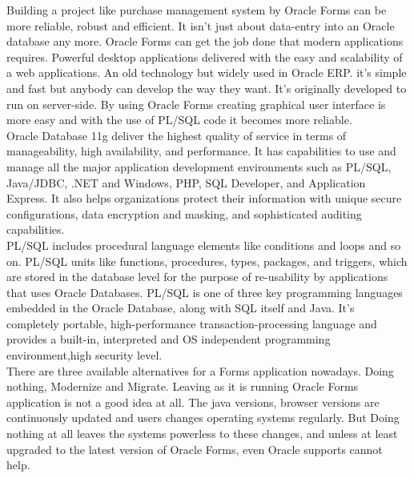 \documentclass[12pt]{report} %
\begin{document}
Building a project like purchase management system by Oracle Forms can be more reliable, robust and efficient. It isn't just about data-entry into an Oracle database any more. Oracle Forms can get the job done that modern applications requires. Powerful desktop applications delivered with the easy and scalability of a web applications. An old technology but widely used in Oracle ERP. it's simple and fast but anybody can develop the way they want. It's originally developed to run on server-side. By using Oracle Forms creating graphical user interface is more easy and with the use of PL/SQL code it becomes more reliable. \cite{form_builder_book}  \label{sec:form_builder_book_1}\\


Oracle Database 11g deliver the highest quality of service in terms of manageability, high availability, and performance. It has capabilities to use and manage all the major application development environments such as PL/SQL, Java/JDBC, .NET and Windows, PHP, SQL Developer, and Application Express. It also helps organizations protect their information with unique secure configurations, data encryption and masking, and sophisticated auditing capabilities. \cite{sql_book, sql_book2} \label{sec:sql_book_1}\\


PL/SQL includes procedural language elements like conditions and loops and so on. PL/SQL units like  functions, procedures,  types, packages, and triggers, which are stored in the database level for the purpose of re-usability by applications that uses Oracle Databases. PL/SQL is one of three key programming languages embedded in the Oracle Database, along with SQL itself and Java. It's completely portable, high-performance transaction-processing language and provides a built-in, interpreted and OS independent programming environment,high security level.\cite{plsql_book, plsql_book2}  \label{sec:plsql_book_1}\\



There are three available alternatives for a Forms application nowadays. Doing nothing, Modernize and Migrate. Leaving as it is running Oracle Forms application is not a good idea at all. The java versions, browser versions are continuously updated and users changes operating systems regularly. But Doing nothing at all leaves the systems powerless to these changes, and unless at least upgraded to the latest version of Oracle Forms, even Oracle supports cannot help. \cite{feature_forms}  \label{sec:feature_forms_1}\\
\end{document}
